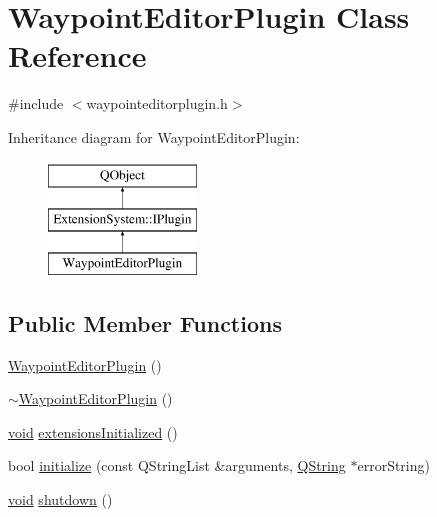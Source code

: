 \hypertarget{class_waypoint_editor_plugin}{\section{Waypoint\-Editor\-Plugin Class Reference}
\label{class_waypoint_editor_plugin}
}


{\ttfamily \#include $<$waypointeditorplugin.\-h$>$}

Inheritance diagram for Waypoint\-Editor\-Plugin\-:\begin{figure}[H]
\begin{center}
\leavevmode
\includegraphics[height=3.000000cm]{class_waypoint_editor_plugin}
\end{center}
\end{figure}
\subsection*{Public Member Functions}
\begin{DoxyCompactItemize}
\item 
\hyperlink{group___waypoint_editor_gadget_plugin_gab79d5211378f7e8d1c28ac11e4a2be91}{Waypoint\-Editor\-Plugin} ()
\item 
\hyperlink{group___waypoint_editor_gadget_plugin_gada6348846ef5c9b1a2778bd9ed769857}{$\sim$\-Waypoint\-Editor\-Plugin} ()
\item 
\hyperlink{group___u_a_v_objects_plugin_ga444cf2ff3f0ecbe028adce838d373f5c}{void} \hyperlink{group___waypoint_editor_gadget_plugin_ga2df66419e41be573431fc273f596cc71}{extensions\-Initialized} ()
\item 
bool \hyperlink{group___waypoint_editor_gadget_plugin_gaaea9c5cb6306b4ee7b48412c09660111}{initialize} (const Q\-String\-List \&arguments, \hyperlink{group___u_a_v_objects_plugin_gab9d252f49c333c94a72f97ce3105a32d}{Q\-String} $\ast$error\-String)
\item 
\hyperlink{group___u_a_v_objects_plugin_ga444cf2ff3f0ecbe028adce838d373f5c}{void} \hyperlink{group___waypoint_editor_gadget_plugin_ga4fdf75a1aea39e6e89f5fe83b8b812f9}{shutdown} ()
\end{DoxyCompactItemize}


